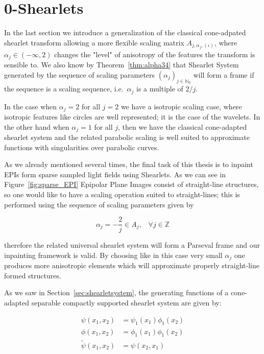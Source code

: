 \section{0-Shearlets}
\label{sec:0-Shearlets}

In the last section we introduce a generalization of the classical cone-adpated shearlet transform allowing a more flexible scaling matrix $A_{j,\alpha_j,(\iota)}$, where $\alpha_j\in (-\infty,2)$ changes the "level" of anisotropy of the features the transform is sensible to. We also know by Theorem~\ref{thm:alpha34} that Shearlet System generated by the sequence of scaling parameters $(\alpha_j)_{j\in\mathbb{N}_0}$ will form a frame if the sequence is a scaling sequence, i.e.\ $\alpha_j$ is a multiple of $2/j$.

\bigskip

 In the case when $\alpha_j=2$ for all $j=2$ we have a isotropic scaling case, where isotropic features like circles are well represented; it is the case of the wavelets. In the other hand when $\alpha_j=1$ for all $j$, then we have the classical cone-adapted shearlet system and the related parabolic scaling is well suited to approximate functions with singularities over parabolic curves. 

\bigskip

As we already mentioned several times, the final task of this thesis is to inpaint EPIs form sparse sampled light fields using Shearlets. As we can see in Figure~\ref{fig:sparse_EPI} Epipolar Plane Images consist of straight-line structures, so one would like to have a scaling operation suited to straight-lines; this is performed using the sequence of scaling parameters given by

$$
\alpha_j=-\frac{2}{j}\in A_j\textrm{,}\quad \forall j\in\mathbb{Z}
$$

therefore the related universal shearlet system will form a Parseval frame and our inpainting framework is valid. By choosing like in this case very small $\alpha_j$ one produces more anisotropic elements which will approximate properly straight-line formed structures.

\bigskip

As we saw in Section~\ref{sec:shearletsystem}, the generating functions of a cone-adapted separable compactly supported shearlet system are given by:

$$
\begin{aligned}
\psi(x_1,x_2)&=\psi_1(x_1)\phi_1(x_2)\\
\phi(x_1,x_2)&=\phi_1(x_1)\phi_1(x_2)\\
\tilde{\psi}(x_1,x_2)&=\psi(x_2,x_1)
\end{aligned}
$$

